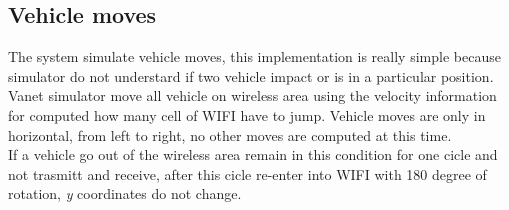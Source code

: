 \subsection{Vehicle moves}
The system simulate vehicle moves, this implementation is really simple because simulator do not understard if two vehicle impact or is in a particular position. Vanet simulator move all vehicle on wireless area using the velocity information for computed how many cell of WIFI have to jump. Vehicle moves are only in horizontal, from left to right, no other moves are computed at this time.\\
If a vehicle go out of the wireless area remain in this condition for one cicle and not trasmitt and receive, after this cicle re-enter into WIFI with 180 degree of rotation, \textit{y} coordinates do not change.